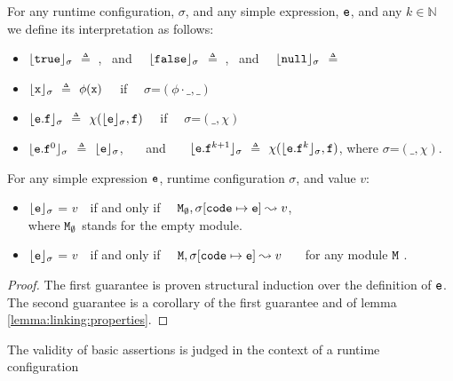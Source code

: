 \begin{definition}[Interpretations]

For any runtime configuration, $\sigma$, and any simple expression, ${\mbox{\tt{e}}}$, and any $k\in \mathbb{N}$ we define its interpretation as follows:

\begin{itemize}
     \item 
  ${\lfloor{ {{\mbox{\tt{true}}}}}\rfloor_{\sigma}}$ $ \triangleq$   , \ and \ \    ${\lfloor{ {{\mbox{\tt{false}}}}}\rfloor_{\sigma}}$ $ \triangleq$ , \ and \ \ 
   $\interp {}{\sigma}$ $ \triangleq$  \prg{null}
  \item
  ${\lfloor{ {{\mbox{\tt{x}}}}}\rfloor_{\sigma}}$ $ \triangleq$ $\phi({\mbox{\tt{x}}})$  \ \ if \ \ $\sigma$=$(\phi\cdot\_,\_)$
  \item
  ${\lfloor{ {\ensuremath{{\mbox{\tt{e}}}}.{\mbox{\tt{f}}}}}\rfloor_{\sigma}}$ $ \triangleq$ $\chi({{\lfloor{ {\ensuremath{{\mbox{\tt{e}}}}}}\rfloor_{\sigma}}}, {\mbox{\tt{f}}})$  \ \ if \ \ $\sigma$=$(\_,\chi)$
   \item
     ${\lfloor{ {\ensuremath{{\mbox{\tt{e}}}}.{\mbox{\tt{f}}}^0}}\rfloor_{\sigma}}$ $ \triangleq$  ${\lfloor{ {\ensuremath{{\mbox{\tt{e}}}}}}\rfloor_{\sigma}}$, \ \ \ and \ \ \ ${\lfloor{ {\ensuremath{{\mbox{\tt{e}}}}.{\mbox{\tt{f}}}^{k+1}}}\rfloor_{\sigma}}$ $ \triangleq$  $\chi({{\lfloor{ {\ensuremath{{\mbox{\tt{e}}}}.{\mbox{\tt{f}}}^k}}\rfloor_{\sigma}}}, {\mbox{\tt{f}}})$, where $\sigma$=$(\_,\chi)$.
   \end{itemize}
\end{definition}

\begin{lemma}
For any simple expression ${\mbox{\tt{e}}}$, runtime configuration $\sigma$, and value $v$:

\begin{itemize}
     \item 
  ${\lfloor{ {\ensuremath{{\mbox{\tt{e}}}}}}\rfloor_{\sigma}}$ = $v$\ \     if and only if \ \ ${\mbox{\tt{\ensuremath{{\mbox{\tt{M}}}}}}}_\emptyset, \sigma[{\mbox{\tt{code}}}\mapsto {\mbox{\tt{e}}}] \leadsto v$,\\
  where ${\mbox{\tt{\ensuremath{{\mbox{\tt{M}}}}}}}_\emptyset$ stands for the empty module.
  \item
   ${\lfloor{ {\ensuremath{{\mbox{\tt{e}}}}}}\rfloor_{\sigma}}$ = $v$\ \     if and only if \ \ ${\mbox{\tt{\ensuremath{{\mbox{\tt{M}}}}}}}, \sigma[{\mbox{\tt{code}}}\mapsto {\mbox{\tt{e}}}] \leadsto v$ \ \ \ for any module ${\mbox{\tt{\ensuremath{{\mbox{\tt{M}}}}}}}$ .
   \end{itemize}
   \end{lemma}
   
   \begin{proof} The  first guarantee is proven structural induction  over the definition of ${\mbox{\tt{e}}}$.
   The second guarantee  is a corollary of the first guarantee  and of lemma \ref{lemma:linking:properties}.\end{proof}


The validity of basic assertions is judged in the context of a runtime configuration


